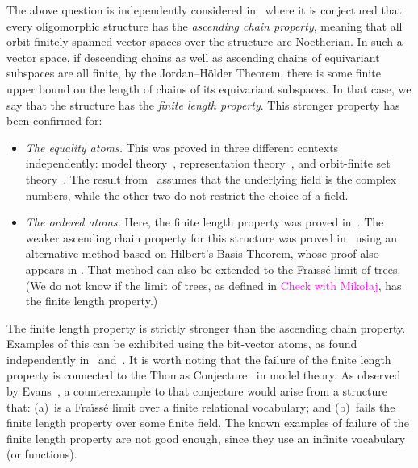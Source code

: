 The above question is independently considered in~\cite[p.~21]{BFKM24} where it is conjectured that every oligomorphic structure has the \emph{ascending chain property}, meaning that all orbit-finitely spanned vector spaces over the structure are Noetherian.
In such a vector space, if descending chains as well as ascending chains of equivariant subspaces are all finite, by the Jordan--Hölder Theorem, there is some finite upper bound on the length of chains of its equivariant subspaces.
In that case, we say that the structure has the \emph{finite length property}.
This stronger property has been confirmed for:
\begin{itemize}
    \item \emph{The equality atoms.} 
    This was proved in three different contexts independently: model theory~\cite[Thm.~3.9]{EvansRashwan_02}, representation theory~\cite[Prop.~6.1.6]{SamSnowden_15}, and orbit-finite set theory~\cite[Cor.~4.9]{BFKM24}. 
    The result from~\cite{SamSnowden_15} assumes that the underlying field is the complex numbers, while the other two do not restrict the choice of a field. 
    \item \emph{The ordered atoms.} 
    Here, the finite length property was proved in~\cite[Thm.~4.8]{BFKM24}. 
    The weaker ascending chain property for this structure was proved in~\cite[Thm.~27]{GhoshLasota_24} using an alternative method based on Hilbert's Basis Theorem, 
    whose proof also appears in \cite[Ex.~3.2(c)]{LaudoneSnowden_23}. 
    That method can also be extended to the Fraïssé limit of trees.
    (We do not know if the limit of trees, as defined in \cite[Fct.~2.16]{KaplanRzepeckiSiniora_21} \textcolor{magenta}{Check with Mikołaj}, has the finite length property.)
\end{itemize}
The finite length property is strictly stronger than the ascending chain property. 
Examples of this can be exhibited using the bit-vector atoms, as found independently in~\cite[Thm.~2.7]{Gray97} and~\cite[Thm.~4.16]{BFKM24}. 
It is worth noting that the failure of the finite length property is connected to the Thomas Conjecture~\cite[p.~177]{thomas1991reducts} in model theory. 
As observed by Evans~\cite[Sld.~6]{Evans2025Permutation}, a counterexample to that conjecture would arise from a structure that: 
(a)~is a Fraïssé limit over a finite relational vocabulary; 
and (b)~fails the finite length property over some finite field. 
The known examples of failure of the finite length property are not good enough, since they use an infinite vocabulary (or functions).

